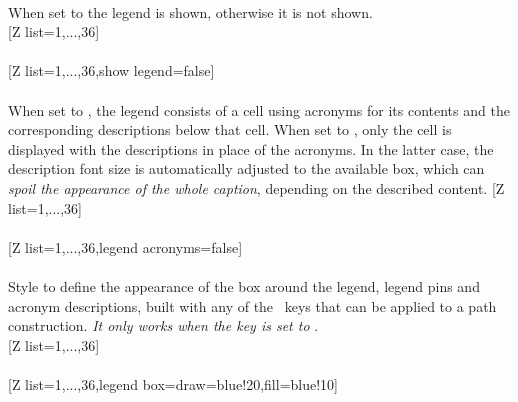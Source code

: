 \\ [0pt]\pgfPTendstyle%
\label{option_show legend}%
%
{When set to  the legend is shown, otherwise it is not shown.}%
\\ [5pt][Z list={1,...,36}]%
\\ [10pt]\makebox[\linewidth][c]{\scalebox{.6}{\pgfPT[Z list={1,...,36}]}}%
\\ [5pt][Z list={1,...,36},show legend=false]%
\\ [10pt]\makebox[\linewidth][c]{\scalebox{.6}{\pgfPT[Z list={1,...,36},show legend=false]}}%
\\ [0pt]\pgfPTendoption%
\vfill%
\label{option_legend acronyms}%
%
{When set to , the legend consists of a cell using acronyms for its contents and the corres\-ponding des\-criptions below that cell.
When set to , only the cell is displayed with the des\-criptions in place of the acronyms. In the latter case, the description font size is automatically adjusted to the available box, which can \textit{spoil the appearance of the whole caption}, depending on the described content.
}%
\vfill%
\newpage%
[Z list={1,...,36}]%
\\ [10pt]\makebox[\linewidth][c]{\scalebox{.6}{\pgfPT[Z list={1,...,36}]}}%
\\ [5pt][Z list={1,...,36},legend acronyms=false]%
\\ [10pt]\makebox[\linewidth][c]{\scalebox{.6}{\pgfPT[Z list={1,...,36},legend acronyms=false]}}%
\\ [0pt]\pgfPTendoption%
\label{style_legend box}%
\vfill%
%
{Style to define the appearance of the box around the legend, legend pins and acronym descriptions, built with any of the \txttikz\ keys that can be applied to a path construction.
\textit{It only works when the key  is set to }.}%
\\ [5pt][Z list={1,...,36}]%
\\ [10pt]\makebox[\linewidth][c]{\scalebox{.6}{\pgfPT[Z list={1,...,36}]}}%
\\ [10pt][Z list={1,...,36},legend box={draw=blue!20,fill=blue!10}]%
\\ [10pt]\makebox[\linewidth][c]{\scalebox{.6}{\pgfPT[Z list={1,...,36},legend box={draw=blue!20,fill=blue!10}]}}%
